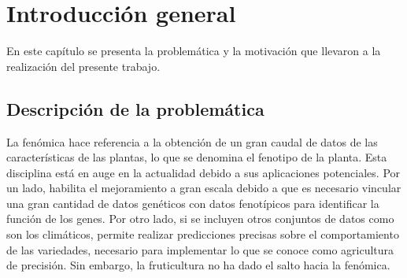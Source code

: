 
\chapter{Introducción general} %

\label{Chapter1} %
\label{IntroGeneral}


\newcommand{\keyword}[1]{\textbf{#1}}
\newcommand{\tabhead}[1]{\textbf{#1}}
\newcommand{\code}[1]{\texttt{#1}}
\newcommand{\file}[1]{\texttt{\bfseries#1}}
\newcommand{\option}[1]{\texttt{\itshape#1}}
\newcommand{\grados}{$^{\circ}$}




En este capítulo se presenta la problemática y la motivación que llevaron a la realización del presente trabajo.

\section{Descripción de la problemática}

La fenómica hace referencia a la obtención de un gran caudal de datos de las características de las plantas, lo que se denomina el fenotipo de la planta. Esta disciplina está en auge en la actualidad debido a sus aplicaciones potenciales. Por un lado, habilita el mejoramiento a gran escala debido a que es necesario vincular una gran cantidad de datos genéticos con datos fenotípicos para identificar la función de los genes. Por otro lado, si se incluyen otros conjuntos de datos como son los climáticos, permite realizar predicciones precisas sobre el comportamiento de las variedades, necesario para implementar lo que se conoce como agricultura de precisión. Sin embargo, la fruticultura no ha dado el salto hacia la fenómica.

